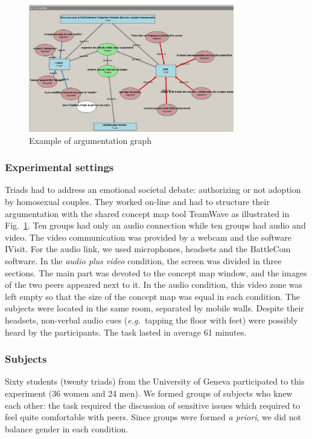 \documentclass[natbib]{svjour3}
\newcommand{\eg}{{\textit{e.g.\ }}}
\begin{document}
\begin{figure}[ht!]
        \centering
        \includegraphics[width=0.8\textwidth]{image8.jpg}
        \caption{Example of argumentation graph}
        \label{study3:argumentation_graph}
\end{figure}


\subsubsection*{Experimental settings} 

Triads had to address an emotional societal debate: authorizing or not adoption
by homosexual couples. They worked on-line and had to structure their
argumentation with the shared concept map tool {\sc TeamWave} as illustrated in
Fig.~\ref{study3:argumentation_graph}. Ten groups had only an audio connection
while ten groups had audio and video. The video communication was provided by a
webcam and the software {\sc IVisit}. For the audio link, we used microphones,
headsets and the {\sc BattleCom} software. In the \emph{audio plus video}
condition, the screen was divided in three sections. The main part was devoted
to the concept map window, and the images of the two peers appeared next to it.
In the audio condition, this video zone was left empty so that the size of the
concept map was equal in each condition. The subjects were located in the same
room, separated by mobile walls. Despite their headsets, non-verbal audio cues
(\eg tapping the floor with feet) were possibly heard by the participants. The
task lasted in average 61 minutes.

\subsubsection*{Subjects}

Sixty students (twenty triads) from the University of Geneva participated to
this experiment (36 women and 24 men). We formed groups of subjects who knew
each other: the task required the discussion of sensitive issues which required
to feel quite comfortable with peers. Since groups were formed \textit{a
priori}, we did not balance gender in each condition.
\end{document}
